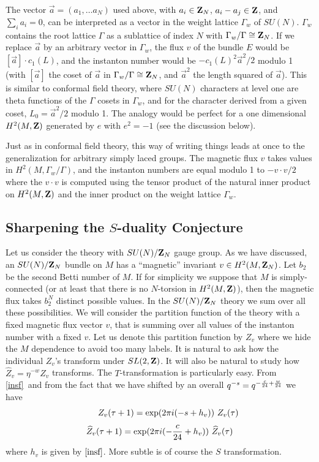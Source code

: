 \documentclass[12pt]{article}
\numberwithin{equation}{section}
\begin{document}
The vector $\vec a=(a_1,\dots a_N)$ used above, with
$a_i\in {\bf Z}_N$, $a_i-a_j\in {\bf Z}$, and $\sum_i a_i=0$,
can be interpreted as a vector in the weight lattice $\Gamma_w$
of $SU(N)$.  $\Gamma_w$ contains the root lattice $\Gamma$ as a sublattice
of index $N$ with $\Gamma_w/\Gamma\cong {\bf Z}_N$.
If we replace $\vec a$ by an arbitrary vector in $\Gamma_w$,
the flux $v$ of the bundle $E$ would be $[\vec a]\cdot c_1(L)$,
and the instanton number would be $-c_1(L)^2\vec a^2/2$ modulo 1
(with $[\vec a]$ the coset of $\vec a$ in $\Gamma_w/\Gamma\cong {\bf Z}_N$,
and $\vec a^2$ the length squared of $\vec a$).
This is similar to conformal field theory, where $SU(N)$ characters
at level one are theta functions of the $\Gamma$ cosets in $\Gamma_w$,
and for the character derived from a given coset, $L_0=\vec a^2/2$ modulo
1.  The analogy would be perfect for a one dimensional $H^2(M,{\bf Z})$
generated by $e$ with $e^2=-1$ (see the discussion below).

Just as in conformal field theory, this
way of writing things leads at once to the generalization for arbitrary
simply laced groups.  The magnetic flux $v$ takes values in
$H^2(M,\Gamma_w/\Gamma)$, and the instanton numbers are equal modulo 1 to
$-v\cdot v/2$ where the $v\cdot v$ is computed
using the tensor product of the natural inner
product on $H^2(M,{\bf Z})$
and the inner product on the weight lattice $\Gamma_w$.

\subsection{Sharpening the \texorpdfstring{$S$}{S}-duality Conjecture}

Let us consider the theory with
$SU(N)/{\bf Z}_N$ gauge group.  As we have discussed,
an $SU(N)/{\bf Z}_N$ bundle on $M$ has a ``magnetic'' invariant
$v \in H^2(M,{\bf Z}_N)$.
Let $b_2$ be the second Betti number of $M$.  If for simplicity we
suppose that $M$ is simply-connected (or at least that there is no
$N$-torsion in $H^2(M,{\bf Z})$), then the magnetic flux takes
$b_2 ^N$ distinct possible values.
In the $SU(N)/{\bf Z}_N$ theory we sum over all these
possibilities. We will consider the partition
function of the theory with a fixed magnetic flux
vector $v$, that is summing over all values of the instanton
number with a fixed $v$. Let us denote this partition function by $Z_v$ where
we hide the $M$ dependence to avoid too many
labels. It is natural to ask how the individual $Z_v$'s transform under
$SL(2,{\bf Z})$. It will also be natural to study how ${\hat Z_v}
=\eta^{-w}{ Z_v}$ transforms.
The $T$-transformation is particularly easy.
{}From \eqref{insf}\ and from the fact that we  have shifted by an
overall $q^{-s}=q^{-{c\over 24}+{w\over 24}}$ we have
%
$$\qquad Z_v(\tau+1)={\rm exp}(2\pi i(-s +h_v)) \ Z_v(\tau)$$
\begin{equation}
  \label{ttran}
  {\hat Z_v}(\tau+1)={\rm exp}(2\pi i(-{c\over 24} +h_v)) \ {\hat Z_v}(\tau)
\end{equation}
%
where $h_v$ is given by $\eqref{insf}$.  More subtle
is of course the $S$ transformation.
\end{document}
